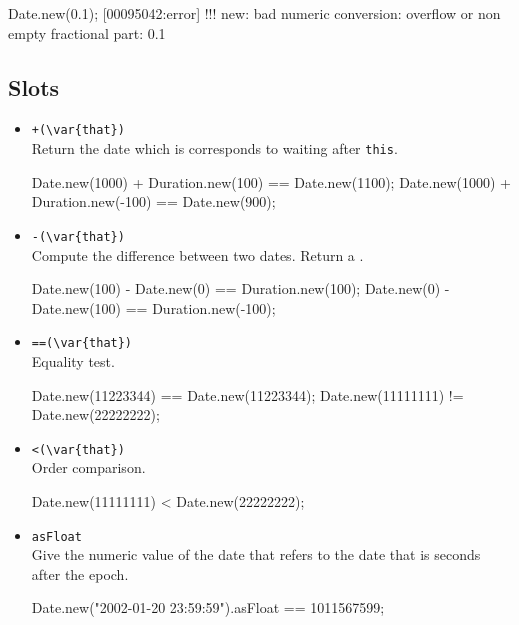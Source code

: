 \begin{urbiscript}[firstnumber=last]
Date.new(0.1);
[00095042:error] !!! new: bad numeric conversion: overflow or non empty fractional part: 0.1
\end{urbiscript}

\subsection{Slots}

\begin{itemize}
\item \lstinline|+(\var{that})|\\
  Return the date which is corresponds to waiting 
   after \lstinline|this|.
\begin{urbiassert}[firstnumber=last]
Date.new(1000) + Duration.new(100) == Date.new(1100);
Date.new(1000) + Duration.new(-100) == Date.new(900);
\end{urbiassert}

\item \lstinline|-(\var{that})|\\
  Compute the difference between two dates.  Return a
  .
\begin{urbiassert}[firstnumber=last]
Date.new(100) - Date.new(0) == Duration.new(100);
Date.new(0) - Date.new(100) == Duration.new(-100);
\end{urbiassert}

\item \lstinline|==(\var{that})|\\
  Equality test.
\begin{urbiassert}[firstnumber=last]
Date.new(11223344) == Date.new(11223344);
Date.new(11111111) != Date.new(22222222);
\end{urbiassert}

\item \lstinline|<(\var{that})|\\
  Order comparison.
\begin{urbiassert}[firstnumber=last]
Date.new(11111111) < Date.new(22222222);
\end{urbiassert}

\item \lstinline|asFloat|\\
  Give the numeric value of the date that refers to the date that is 
seconds after the epoch.
\begin{urbiassert}[firstnumber=last]
Date.new("2002-01-20 23:59:59").asFloat == 1011567599;
\end{urbiassert}


\end{itemize}

